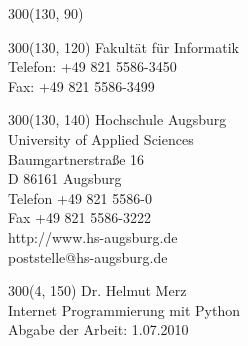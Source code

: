 \begin{titlepage}
\begin{textblock}{300}(130, 90)
\fontsize{8}{8}
\selectfont 
\parindent0mm
\end{textblock}

\begin{textblock}{300}(130, 120)
\fontsize{8}{8}
\selectfont 
\parindent0mm
Fakultät für Informatik\\
Telefon: +49 821 5586-3450\\
Fax:       +49 821 5586-3499\\
\end{textblock}

\begin{textblock}{300}(130, 140)
\fontsize{8}{8}
\selectfont 
\parindent0mm
Hochschule Augsburg\\
University of Applied Sciences\\
Baumgartnerstraße 16\\
D 86161 Augsburg\\

Telefon +49 821 5586-0\\
Fax +49 821 5586-3222\\
http://www.hs-augsburg.de\\
poststelle@hs-augsburg.de
\end{textblock}


\begin{textblock}{300}(4, 150)
\fontsize{20}{20}
\selectfont 
\parindent0mm
Dr. Helmut Merz\\
Internet Programmierung mit Python\\
Abgabe der Arbeit: 1.07.2010 
\end{textblock}

\end{titlepage}